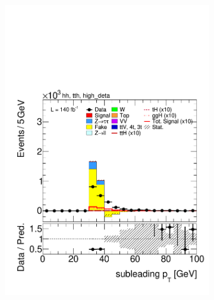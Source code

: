 \begin{figure}[htbp]
        \begin{subfigure}[b]{0.45\textwidth}
          \centering
          \includegraphics[width=\textwidth]{images/highdeta_highdeta_run2/plot_tau_1_pt_hh_tth_15_16_17_18_high_deta.pdf}
          \caption{}
        \end{subfigure}
        \hfill
        \begin{subfigure}[b]{0.45\textwidth}
          \centering

\end{subfigure}
\end{figure}
